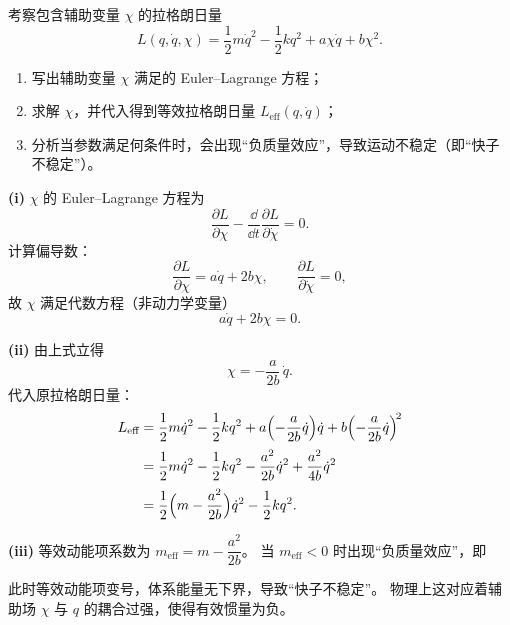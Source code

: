 \newcommand{\ii}{\mathrm{i}}
\newcommand{\ee}{\mathrm{e}}
\begin{question}[含辅助变量的拉格朗日量]
考察包含辅助变量 $\chi$ 的拉格朗日量
\[
L(q,\dot q,\chi)=\frac12 m\dot q^{2}-\frac12 k q^{2}+a\chi\dot q+b\chi^{2}.
\]

\begin{enumerate}[label=(\roman*)]
  \item 写出辅助变量 $\chi$ 满足的 Euler--Lagrange 方程；
  \item 求解 $\chi$，并代入得到等效拉格朗日量 $L_{\text{eff}}(q,\dot q)$；
  \item 分析当参数满足何条件时，会出现``负质量效应''，导致运动不稳定（即``快子不稳定''）。
\end{enumerate}

\begin{solution}

\textbf{(i)} $\chi$ 的 Euler--Lagrange 方程为
\[
\frac{\partial L}{\partial\chi}-\frac{\dd}{\dd t}\frac{\partial L}{\partial\dot\chi}=0.
\]
计算偏导数：
\[
\frac{\partial L}{\partial\chi}=a\dot q+2b\chi,\qquad
\frac{\partial L}{\partial\dot\chi}=0,
\]
故 $\chi$ 满足代数方程（非动力学变量）
\[
a\dot q+2b\chi=0.
\]

\textbf{(ii)} 由上式立得
\[
\chi=-\frac{a}{2b}\,\dot q.
\]
代入原拉格朗日量：
\begin{align*}
L_{\text{eff}}
&=\frac12 m\dot q^{2}-\frac12 k q^{2}
+a\Bigl(-\frac{a}{2b}\dot q\Bigr)\dot q
+b\Bigl(-\frac{a}{2b}\dot q\Bigr)^{\!2} \\[2pt]
&=\frac12 m\dot q^{2}-\frac12 k q^{2}
-\frac{a^{2}}{2b}\dot q^{2}+\frac{a^{2}}{4b}\dot q^{2} \\[2pt]
&=\frac12\Bigl(m-\frac{a^{2}}{2b}\Bigr)\dot q^{2}
-\frac12 k q^{2}.
\end{align*}

\textbf{(iii)} 等效动能项系数为 $m_{\text{eff}}=m-\dfrac{a^{2}}{2b}$。
当 $m_{\text{eff}}<0$ 时出现``负质量效应''，即


此时等效动能项变号，体系能量无下界，导致``快子不稳定''。
物理上这对应着辅助场 $\chi$ 与 $q$ 的耦合过强，使得有效惯量为负。
\end{solution}
\end{question}


